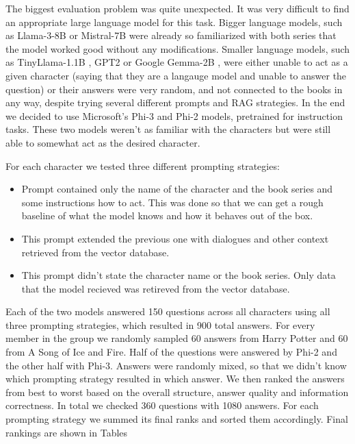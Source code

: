 \documentclass[fleqn,moreauthors,10pt]{ds_report}
\begin{document}
The biggest evaluation problem was quite unexpected. It was very difficult to find an appropriate large language model for this task.
Bigger language models, such as Llama-3-8B \cite{llama3modelcard} or Mistral-7B \cite{jiang2023mistral} were already so familiarized with both series that the model worked good without any modifications.
Smaller language models, such as TinyLlama-1.1B \cite{zhang2024tinyllama}, GPT2 \cite{radford2019language} or Google Gemma-2B \cite{gemma_2024},
were either unable to act as a given character (saying that they are a langauge model and unable to answer the question)
or their answers were very random, and not connected to the books in any way, despite trying several different prompts and RAG strategies.
In the end we decided to use Microsoft's Phi-3 \cite{abdin2024phi} and Phi-2 models, pretrained for instruction tasks.
These two models weren't as familiar with the characters but were still able to somewhat act as the desired character.

For each character we tested three different prompting strategies:
\begin{itemize}
	\item Prompt contained only the name of the character and the book series and some instructions how to act. This was done so that we can get a rough baseline of what the model knows and how it behaves out of the box.
	\item This prompt extended the previous one with dialogues and other context retrieved from the vector database.
	\item This prompt didn't state the character name or the book series. Only data that the model recieved was retireved from the vector database.
\end{itemize}

Each of the two models answered 150 questions across all characters using all three prompting strategies, which resulted in 900 total answers.
For every member in the group we randomly sampled 60 answers from Harry Potter and 60 from A Song of Ice and Fire.
Half of the questions were answered by Phi-2 and the other half with Phi-3.
Answers were randomly mixed, so that we didn't know which prompting strategy resulted in which answer.
We then ranked the answers from best to worst based on the overall structure, answer quality and information correctness.
In total we checked 360 questions with 1080 answers.
For each prompting strategy we summed its final ranks and sorted them accordingly.
Final rankings are shown in Tables 
\end{document}
